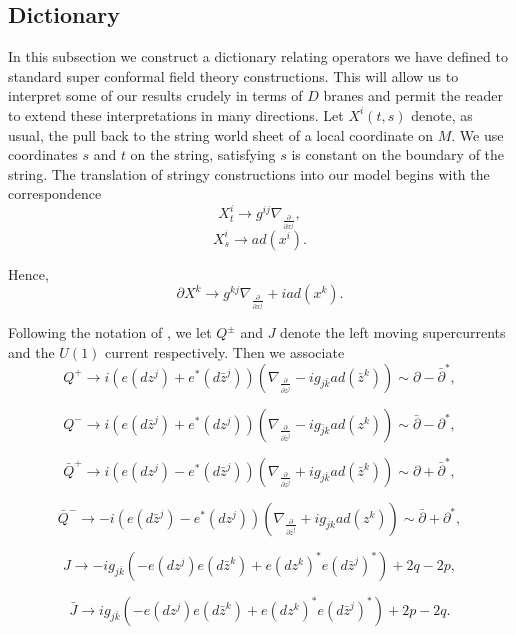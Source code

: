 \documentclass[a4paper,11pt]{amsart}
\newcommand{\db}{\bar{\partial}}
\begin{document}
\subsection{Dictionary}\label{dict}
In this subsection we construct a dictionary relating operators we have defined 
to standard super conformal field theory constructions. This will allow 
us to interpret some of our results crudely in terms of $D$ branes and permit
the reader to extend these interpretations in many directions.  
Let $X^i(t,s)$ denote, as usual, the pull back to the string world sheet of a
 local coordinate on $M$. We use coordinates $s$ and $t$ on the string,
 satisfying $s$ is constant on the boundary of the string. The translation of 
 stringy constructions into our model begins with the correspondence 
$$X^i_t\rightarrow g^{ij}\nabla_{\frac{\partial}{\partial x^j}},$$
$$X^i_s\rightarrow ad(x^i).$$ 
 
Hence, 
$$\partial X^k \rightarrow g^{kj}\nabla_{\frac{\partial}{\partial x^j}} +
iad(x^k).$$
 
Following the notation of \cite{KO}, we let $Q^{\pm}$ and $J$ denote the left
 moving supercurrents and the $U(1)$ current respectively. 
Then we associate 
$$Q^{+}\rightarrow
 i(e(dz^j) + e^*(d\bar z^j))(\nabla_{\frac{\partial}{\partial z^j}} 
  - ig_{j\bar k}ad(\bar z^k))\sim \partial - \db^*,$$
 
$$Q^{-}\rightarrow 
i(e(d\bar z^j) + e^*(dz^j))(\nabla_{\frac{\partial}{\partial\bar z^j}}
 - ig_{\bar{j} k}ad(z^k)) \sim \db - \partial^*,$$
 
$$\bar Q^{+}\rightarrow
 i(e(dz^j) - e^*(d\bar z^j))(\nabla_{\frac{\partial}{\partial z^j}}
 + ig_{j\bar k}ad(\bar z^k)) \sim \partial+\db^*,$$
 
$$\bar Q^{-}\rightarrow 
-i(e(d\bar z^j) - e^*(dz^j))(\nabla_{\frac{\partial}{\partial \bar z^j}}
 + ig_{\bar{j}k}ad(z^k)) \sim \db+\partial^*,$$ 
 
$$J\rightarrow -ig_{j\bar k}(-e(dz^j)e(d\bar z^k) + e(dz^k)^*e(d\bar z^j)^*) 
+ 2q-2p,$$

$$\bar J\rightarrow ig_{j\bar k}(-e(dz^j)e(d\bar z^k) + e(dz^k)^*e(d\bar
z^j)^*) + 2p-2q.$$
\end{document}
